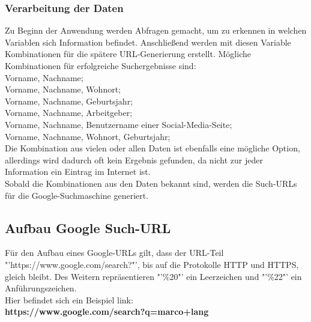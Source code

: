 		\subsubsection{Verarbeitung der Daten}
		Zu Beginn der Anwendung werden Abfragen gemacht, um zu erkennen in welchen Variablen sich Information befindet. Anschließend werden mit diesen Variable Kombinationen für die spätere URL-Generierung erstellt. Mögliche Kombinationen für erfolgreiche Suchergebnisse sind:\\
		Vorname, Nachname;\\
		Vorname, Nachname, Wohnort;\\
		Vorname, Nachname, Geburtsjahr;\\
		Vorname, Nachname, Arbeitgeber;\\
		Vorname, Nachname, Benutzername einer Social-Media-Seite;\\
		Vorname, Nachname, Wohnort, Geburtsjahr;\\
		Die Kombination aus vielen oder allen Daten ist ebenfalls eine mögliche Option, allerdings wird dadurch oft kein Ergebnis gefunden, da nicht zur jeder Information ein Eintrag im Internet ist.\\
		Sobald die Kombinationen aus den Daten bekannt sind, werden die Such-URLs für die Google-Suchmaschine generiert.
		
	\subsection{Aufbau Google Such-URL}
	\label{subsec:AufbauGoogleURL}
		Für den Aufbau eines Google-URLs gilt, dass der URL-Teil "'https://www.google.com/search?"', bis auf die Protokolle HTTP und HTTPS, gleich bleibt. Des Weitern repräsentieren "'\%20"' ein Leerzeichen und "'\%22"' ein Anführungszeichen. \\
		Hier befindet sich ein Beispiel link:\\
		\textbf{https://www.google.com/search?q=marco+lang}
